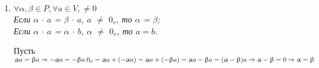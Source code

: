 \begin{enumerate}
	\item \textit{$\forall\alpha,\beta\in P, \forall a \in V, \ne 0$\\Если $\alpha$ $\cdot$ $a$ = $\beta$ $\cdot$ $a$, $a$ $\ne$ $0_v$, то $\alpha$ = $\beta$;}
	\textit{\\ Если $\alpha$ $\cdot$ $a$ = $\alpha$ $\cdot$ $b$, $\alpha$ $\ne$ $0_v$, то $a = b$.}
	
	\begin{Proof} Пусть $\alpha a = \beta a \Rightarrow -\alpha a = -\beta a.\\0_v = \alpha a + (-\alpha a) = \alpha a + (-\beta a) = \alpha a - \beta a = (\alpha - \beta) a\Rightarrow \alpha - \beta = 0\Rightarrow \alpha = \beta$\end{Proof}
\end{enumerate}



















